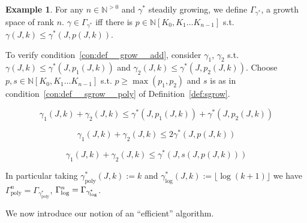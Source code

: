 \documentclass{article}
\numberwithin{equation}{section}
\theoremstyle{definition}
\newtheorem{example}{Example}[section]
\theoremstyle{plain}
\newcommand{\Nats}{\mathbb{N}}
\newcommand{\NatPoly}{\Nats[K_0, K_1 \ldots K_{n-1}]}
\newcommand{\Floor}[1]{\lfloor #1 \rfloor}
\newcommand{\GammaLog}{\Gamma_{\textnormal{log}}}
\begin{document}
\begin{samepage}
\begin{example}

For any ${n \in \Nats^{>0}}$ and ${\gamma^*}$ steadily growing, we define ${\Gamma_{\gamma^*}}$, a growth space of rank ${n}$. ${\gamma \in \Gamma_{\gamma^*}}$ iff there is ${p \in \NatPoly}$ s.t. ${\gamma(J,k) \leq \gamma^*(J,p(J,k))}$. 

To verify condition~\ref{con:def__grow__add}, consider ${\gamma_1}$, ${\gamma_2}$ s.t. ${\gamma(J,k) \leq \gamma^*(J,p_1(J,k))}$ and ${\gamma_2(J,k) \leq \gamma^*(J,p_2(J,k))}$. Choose ${p,s \in \NatPoly}$ s.t. ${p \geq \max(p_1,p_2)}$ and ${s}$ is as in condition~\ref{con:def__sgrow__poly} of Definition~\ref{def:sgrow}.

\[\gamma_1(J,k)+\gamma_2(J,k) \leq \gamma^*(J,p_1(J,k))+\gamma^*(J,p_2(J,k))\]

\[\gamma_1(J,k)+\gamma_2(J,k) \leq 2\gamma^*(J,p(J,k))\]

\[\gamma_1(J,k)+\gamma_2(J,k) \leq \gamma^*(J,s(J,p(J,k)))\]

In particular taking ${\gamma^*_{\text{poly}}(J,k):=k}$ and ${\gamma^*_{\text{log}}(J,k):=\Floor{\log (k+1)}}$ we have ${\Gamma_{\text{poly}}^n=\Gamma_{\gamma^*_{\text{poly}}}}$, ${\GammaLog^n=\Gamma_{\gamma^*_{\text{log}}}}$.

\end{example}
\end{samepage}

We now introduce our notion of an \enquote{efficient} algorithm.
\end{document}
